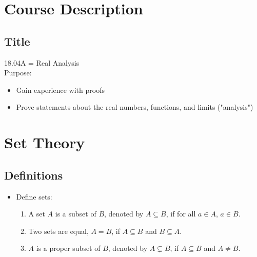 \documentclass{article}
\begin{document}
\section{Course Description}
\subsection{Title}
18.04A = Real Analysis \\
Purpose: 
\begin{itemize}
    \item Gain experience with proofs
    \item Prove statements about the real numbers, functions, and limits ("analysis")
\end{itemize}

\section{Set Theory}
\subsection{Definitions}
\begin{itemize}
    \item Define sets:
        \begin{enumerate}
            \item A set $A$ is a subset of $B$, denoted by $A \subseteq B$, if for all $a \in A$, $a \in B$.
            \item Two sets are equal, $A = B$, if $A \subseteq B$ and $B \subseteq A$.
            \item $A$ is a proper subset of $B$, denoted by $A \subsetneq B$, if $A \subseteq B$ and $A \neq B$.
        \end{enumerate}
\end{itemize}
\end{document}
